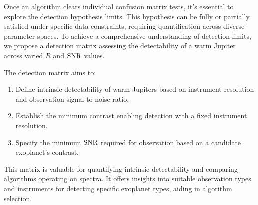 Once an algorithm clears individual confusion matrix tests, it's essential to explore the detection hypothesis limits. This hypothesis can be fully or partially satisfied under specific data constraints, requiring quantification across diverse parameter spaces. To achieve a comprehensive understanding of detection limits, we propose a detection matrix assessing the detectability of a warm Jupiter across varied $R$ and $\rm{SNR}$ values.

The detection matrix aims to:
\begin{enumerate}
    \item Define intrinsic detectability of warm Jupiters based on instrument resolution and observation signal-to-noise ratio.
    \item Establish the minimum contrast enabling detection with a fixed instrument resolution.
\item Specify the minimum $\rm{SNR}$ required for observation based on a candidate exoplanet's contrast.
\end{enumerate}

This matrix is valuable for quantifying intrinsic detectability and comparing algorithms operating on spectra. It offers insights into suitable observation types and instruments for detecting specific exoplanet types, aiding in algorithm selection.

